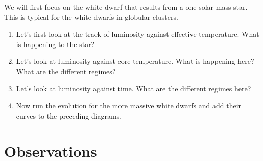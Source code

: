 \documentclass{article}
\begin{document}
We will first focus on the white dwarf that results from a one-solar-mass star.  This is typical for the white dwarfs in globular clusters.

\begin{enumerate}
\item Let's first look at the track of luminosity against effective temperature.  What is happening to the star?
\item Let's look at luminosity against core temperature.  What is happening here?  What are the different regimes?
\item Let's look at luminosity against time.  What are the different regimes here?
\item 
Now run the evolution for the more massive white dwarfs and add their curves to the preceding diagrams.
\end{enumerate}

\section{Observations}

 
\end{document}
